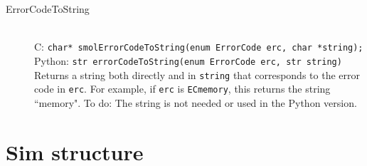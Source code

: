 \documentclass {book}
\begin{document}
\begin{description}
\item[ErrorCodeToString]
\hfill \\
C: \texttt{char* smolErrorCodeToString(enum ErrorCode erc, char *string);}\\
Python: \texttt{str errorCodeToString(enum ErrorCode erc, str string)}\\
Returns a string both directly and in \texttt{string} that corresponds to the error code in \texttt{erc}. For example, if \texttt{erc} is \texttt{ECmemory}, this returns the string ``memory". To do: The string is not needed or used in the Python version.

\end{description}

\section{Sim structure}
\end{document}
